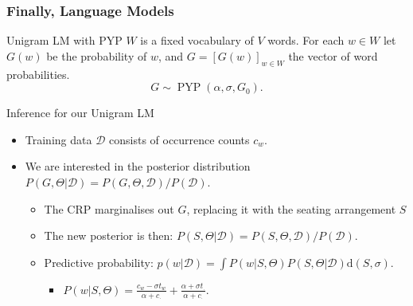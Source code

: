 \begin{frame}
    \frametitle{Finally, Language Models}

    \begin{block}{Unigram LM with PYP}
        $W$ is a fixed vocabulary of $V$ words. For each $w\in W$ let $G(w)$ be the probability of $w$, and $G=[G(w)]_{w\in W}$ the vector of word probabilities. 
\[ G \sim \operatorname{PYP}(\alpha, \sigma, G_0). \] 
    \end{block}

    \begin{block}{Inference for our Unigram LM}
        \begin{itemize}
            \item Training data $\mathcal{D}$ consists of occurrence counts $c_{w}$.
            \item We are interested in the posterior distribution $P(G,\Theta|\mathcal{D}) = P(G,\Theta,\mathcal{D})/P(\mathcal{D})$.
            \begin{itemize}
                \item The CRP marginalises out $G$, replacing it with the seating arrangement $S$
                \item The new posterior is then: $P(S,\Theta|\mathcal{D})=P(S,\Theta,\mathcal{D})/P(\mathcal{D})$.
                \item Predictive probability: $p(w|\mathcal{D})=\int P(w|S,\Theta)P(S,\Theta|\mathcal{D})\text{d}(S,\sigma)$.
                \begin{itemize}
                    \item $P(w|S,\Theta) = \frac{c_w-\sigma t_w}{\alpha+c_\cdot} + \frac{\alpha+\sigma t_\cdot}{\alpha+c_\cdot}$.
                \end{itemize}
            \end{itemize}
        \end{itemize}
    \end{block}


\end{frame}
